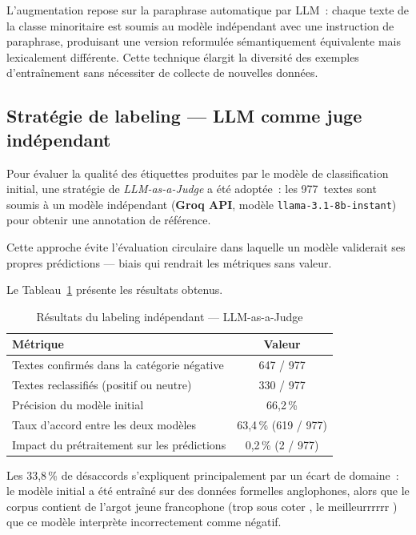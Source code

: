 L'augmentation repose sur la paraphrase automatique par LLM~:
chaque texte de la classe minoritaire est soumis au modèle indépendant
avec une instruction de paraphrase, produisant une version reformulée
sémantiquement équivalente mais lexicalement différente.
Cette technique élargit la diversité des exemples d'entraînement
sans nécessiter de collecte de nouvelles données.

\subsection{Stratégie de labeling — LLM comme juge indépendant}
\label{subsec:labeling}

Pour évaluer la qualité des étiquettes produites par le modèle de classification
initial, une stratégie de \textit{LLM-as-a-Judge} a été adoptée~:
les 977~textes sont soumis à un modèle indépendant (\textbf{Groq API},
modèle \texttt{llama-3.1-8b-instant}) pour obtenir une annotation de référence.

Cette approche évite l'évaluation circulaire dans laquelle un modèle validerait
ses propres prédictions — biais qui rendrait les métriques sans valeur.

Le Tableau~\ref{tab:labeling_results} présente les résultats obtenus.

\vspace{6pt}
\begin{table}[H]
\centering
\caption{Résultats du labeling indépendant — LLM-as-a-Judge}
\label{tab:labeling_results}
\small
\begin{tabular}{|l|c|}
\hline
\textbf{Métrique} & \textbf{Valeur} \\
\hline
Textes confirmés dans la catégorie négative   & 647 / 977 \\
\hline
Textes reclassifiés (positif ou neutre)       & 330 / 977 \\
\hline
Précision du modèle initial                   & 66,2\,\% \\
\hline
Taux d'accord entre les deux modèles         & 63,4\,\% (619 / 977) \\
\hline
Impact du prétraitement sur les prédictions   & 0,2\,\% (2 / 977) \\
\hline
\end{tabular}
\end{table}

Les 33,8\,\% de désaccords s'expliquent principalement par un écart de domaine~:
le modèle initial a été entraîné sur des données formelles anglophones,
alors que le corpus contient de l'argot jeune francophone
(\og trop sous coter \fg{}, \og le meilleurrrrrr \fg{})
que ce modèle interprète incorrectement comme négatif.

